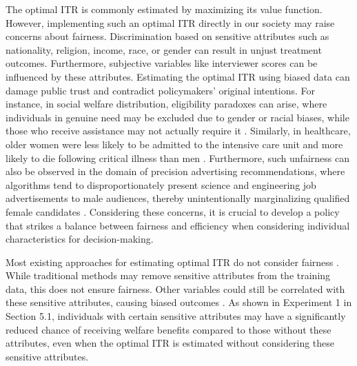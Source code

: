 \documentclass[12pt]{article}
\theoremstyle{plain}
\theoremstyle{definition}
\theoremstyle{remark}
\begin{document}
The optimal ITR is commonly estimated by maximizing its value function. However, implementing such an optimal ITR directly in our society may raise concerns about fairness. Discrimination based on sensitive attributes such as nationality, religion, income, race, or gender can result in unjust treatment outcomes. Furthermore, subjective variables like interviewer scores can be influenced by these attributes. Estimating the optimal ITR using biased data can damage public trust and contradict policymakers' original intentions.
For instance, in social welfare distribution,  eligibility paradoxes can arise, where individuals in genuine need may be excluded due to gender or racial biases, while those who receive assistance may not actually require it \citep{heidari2018fairness}. Similarly, in healthcare, older women were less likely to be admitted to the intensive care unit and more likely to die following critical illness than men \citep{fowler2007sex,penner2010aversive,williams2015racial}.
Furthermore, such unfairness can also be observed in the domain of precision advertising recommendations, where algorithms tend to disproportionately present science and engineering job advertisements to male audiences, thereby unintentionally marginalizing qualified female candidates \citep{lambrecht2019algorithmic}.
 Considering these concerns, it is crucial to develop a policy that strikes a balance between fairness and efficiency when considering individual characteristics for decision-making.



Most existing approaches for estimating optimal ITR do not consider fairness \citep{zhao2012estimating,shi2018high,shi2016robust}.
While traditional methods may remove sensitive attributes from the training data, this does not ensure fairness.  Other variables could still be correlated with these sensitive attributes, causing biased outcomes \citep{penner2010aversive,williams2015racial}. As shown in Experiment 1 in Section 5.1, individuals with certain sensitive attributes may have a significantly reduced chance of receiving welfare benefits compared to those without these attributes, even when the optimal ITR is estimated without considering these sensitive attributes.
\end{document}
